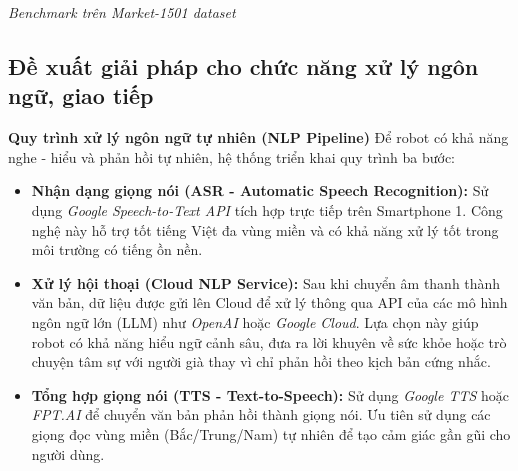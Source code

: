 \textit{Benchmark trên Market-1501 dataset}


\subsection{Đề xuất giải pháp cho chức năng xử lý ngôn ngữ, giao tiếp}

\textbf{Quy trình xử lý ngôn ngữ tự nhiên (NLP Pipeline)}
Để robot có khả năng nghe - hiểu và phản hồi tự nhiên, hệ thống triển khai quy trình ba bước:
\begin{itemize}
    \item \textbf{Nhận dạng giọng nói (ASR - Automatic Speech Recognition):} Sử dụng \textit{Google Speech-to-Text API} tích hợp trực tiếp trên Smartphone 1. Công nghệ này hỗ trợ tốt tiếng Việt đa vùng miền và có khả năng xử lý tốt trong môi trường có tiếng ồn nền.
    \item \textbf{Xử lý hội thoại (Cloud NLP Service):} Sau khi chuyển âm thanh thành văn bản, dữ liệu được gửi lên Cloud để xử lý thông qua API của các mô hình ngôn ngữ lớn (LLM) như \textit{OpenAI} hoặc \textit{Google Cloud}. Lựa chọn này giúp robot có khả năng hiểu ngữ cảnh sâu, đưa ra lời khuyên về sức khỏe hoặc trò chuyện tâm sự với người già thay vì chỉ phản hồi theo kịch bản cứng nhắc.
    \item \textbf{Tổng hợp giọng nói (TTS - Text-to-Speech):} Sử dụng \textit{Google TTS} hoặc \textit{FPT.AI} để chuyển văn bản phản hồi thành giọng nói. Ưu tiên sử dụng các giọng đọc vùng miền (Bắc/Trung/Nam) tự nhiên để tạo cảm giác gần gũi cho người dùng.
\end{itemize}



    
